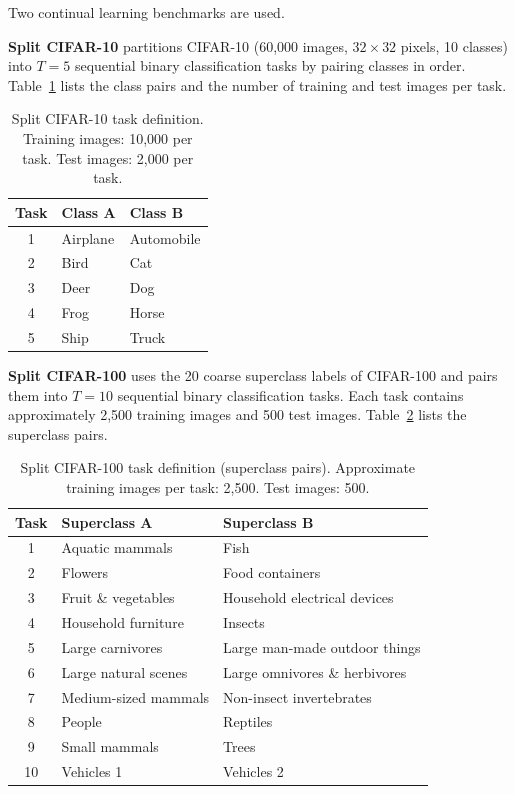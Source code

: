 \documentclass[acmlarge]{acmart}
\begin{document}
Two continual learning benchmarks are used.

\textbf{Split CIFAR-10} \cite{Krizhevsky2009} partitions CIFAR-10 (60,000 images, $32 \times 32$ pixels, 10 classes) into $T = 5$ sequential binary classification tasks by pairing classes in order.
Table~\ref{tab:cifar10_tasks} lists the class pairs and the number of training and test images per task.

\begin{table}[h]
\centering
\caption{Split CIFAR-10 task definition. Training images: 10,000 per task. Test images: 2,000 per task.}
\label{tab:cifar10_tasks}
\begin{tabular}{cll}
\toprule
Task & Class A & Class B \\
\midrule
1 & Airplane & Automobile \\
2 & Bird     & Cat \\
3 & Deer     & Dog \\
4 & Frog     & Horse \\
5 & Ship     & Truck \\
\bottomrule
\end{tabular}
\end{table}

\textbf{Split CIFAR-100} \cite{Krizhevsky2009b} uses the 20 coarse superclass labels of CIFAR-100 and pairs them into $T = 10$ sequential binary classification tasks.
Each task contains approximately 2,500 training images and 500 test images.
Table~\ref{tab:cifar100_tasks} lists the superclass pairs.

\begin{table}[h]
\centering
\caption{Split CIFAR-100 task definition (superclass pairs). Approximate training images per task: 2,500. Test images: 500.}
\label{tab:cifar100_tasks}
\begin{tabular}{cll}
\toprule
Task & Superclass A & Superclass B \\
\midrule
1  & Aquatic mammals      & Fish \\
2  & Flowers              & Food containers \\
3  & Fruit \& vegetables  & Household electrical devices \\
4  & Household furniture  & Insects \\
5  & Large carnivores     & Large man-made outdoor things \\
6  & Large natural scenes & Large omnivores \& herbivores \\
7  & Medium-sized mammals & Non-insect invertebrates \\
8  & People               & Reptiles \\
9  & Small mammals        & Trees \\
10 & Vehicles 1           & Vehicles 2 \\
\bottomrule
\end{tabular}
\end{table}
\end{document}
